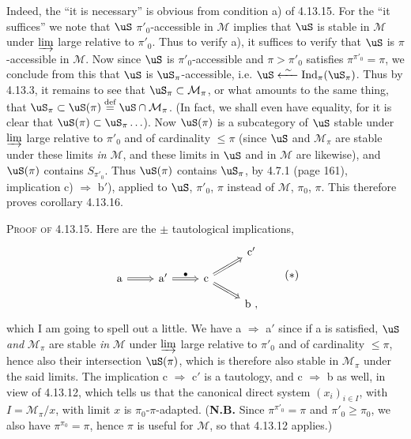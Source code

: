 Indeed, the ``it is necessary'' is obvious from condition a) of 4.13.15. For the ``it suffices'' we note that $\uS$ $\pi'_0$-accessible in $\mathcal{M}$ implies that $\uS$ is stable in $\mathcal{M}$ under $\varinjlim$ large relative to $\pi'_0$. Thus to verify a), it suffices to verify that $\uS$ is $\pi$-accessible in $\mathcal{M}$. Now since $\uS$ is $\pi'_0$-accessible and $\pi > \pi'_0$ satisfies $\pi^{\pi'_0} = \pi$, we conclude from this that $\uS$ is $\uS_\pi$-accessible, i.e. $\uS \xleftarrow{\ \sim\ } \mathrm{Ind}_\pi(\uS_\pi)$. Thus by 4.13.3, it remains to see that $\uS_\pi \subset \mathcal{M}_\pi$, or what amounts to the same thing, that $\uS_\pi \subset \uS(\pi) \overset{\text{def}}{=} \uS \cap \mathcal{M}_\pi$. (In fact, we shall even have equality, for it is clear that $\uS(\pi) \subset \uS_\pi \ldots$). Now $\uS(\pi)$ is a subcategory of $\uS$ stable under $\varinjlim$ large relative to $\pi'_0$ and of cardinality $\leqslant \pi$ (since $\uS$ and $\mathcal{M}_\pi$ are stable under these limits \textit{in} $\mathcal{M}$, and these limits in $\uS$ and in $\mathcal{M}$ are likewise), and $\uS(\pi)$ contains $S_{\pi'_0}$. Thus $\uS(\pi)$ contains $\uS_\pi$, by 4.7.1 (page 161), implication c) $\Longrightarrow$ b$'$), applied to $\uS$, $\pi'_0$, $\pi$ instead of $\mathcal{M}$, $\pi_0$, $\pi$. This therefore proves corollary 4.13.16. %

\textsc{Proof of} 4.13.15. Here are the $\pm$ tautological implications,
\[
\begin{tikzcd}[row sep=small]
 & & & \mathrm{c}' \\
\mathrm{a} \arrow[r, Rightarrow] & \mathrm{a}' \arrow[r, Rightarrow, "\bullet"] & \mathrm{c} \arrow[ur, Rightarrow] \arrow[dr, Rightarrow] & \\
 & & & \mathrm{b}\ ,
\end{tikzcd}
\tag*{$(*)$}
\]
which I am going to spell out a little. We have a $\Longrightarrow$ a$'$ since if a is satisfied, $\uS$ \textit{and} $\mathcal{M}_\pi$ are stable \textit{in} $\mathcal{M}$ under $\varinjlim$ large relative to $\pi'_0$ and of cardinality $\leqslant \pi$, hence also their intersection $\uS(\pi)$,
which is therefore also stable in $\mathcal{M}_\pi$ under the said limits. The implication c $\Longrightarrow$ c$'$ is a tautology, and c $\Longrightarrow$ b as well, in view of 4.13.12, which tells us that the canonical direct system $(x_i)_{i\in I}$, with $I = \mathcal{M}_\pi/x$, with limit $x$ is $\pi_0$-$\pi$-adapted. (\textbf{N.B.} Since $\pi^{\pi'_0} = \pi$ and $\pi'_0 \geqslant \pi_0$, we also have $\pi^{\pi_0} = \pi$, hence $\pi$ is useful for $\mathcal{M}$, so that 4.13.12 applies.)

